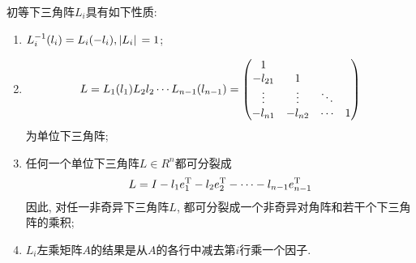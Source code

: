 \begin{theorem}
    初等下三角阵$L_i$具有如下性质:
    \begin{enumerate}
        \item $L_i^{-1}(l_i)=L_i(-l_i), \abs*{L_i}=1$;
        \item \begin{equation*}
            L=L_1(l_1)L_2l_2\cdots L_{n-1}(l_{n-1})=\mqty(
                1&&&\\
                -l_{21}&1&&\\
                \vdots&\vdots&\ddots&\\
                -l_{n1}&-l_{n2}&\cdots&1
            )
        \end{equation*}
        为单位下三角阵;
        \item 任何一个单位下三角阵$L\in R^n$都可分裂成
        \begin{equation*}
            L=I-l_1e_1^\text{T}-l_2e_2^\text{T}-\cdots-l_{n-1}e_{n-1}^\text{T}
        \end{equation*}
        因此, 对任一非奇异下三角阵$L$, 都可分裂成一个非奇异对角阵和若干个下三角阵的乘积;
        \item $L_i$左乘矩阵$A$的结果是从$A$的各行中减去第$i$行乘一个因子.
    \end{enumerate}
\end{theorem}